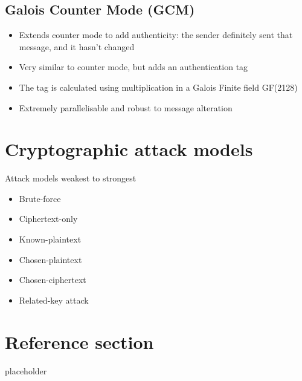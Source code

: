 \documentclass{article}
\begin{document}
\subsection{Galois Counter Mode (GCM)}
\begin{itemize}
  \item Extends counter mode to add authenticity: the sender definitely sent that message, and it hasn’t changed 
  \item Very similar to counter mode, but adds an authentication tag 
  \item The tag is calculated using multiplication in a Galois Finite field GF(2128) 
  \item Extremely parallelisable and robust to message alteration
\end{itemize}

\section{Cryptographic attack models}
\begin{flushleft}
Attack models weakest to strongest
\end{flushleft}
\begin{itemize}
  \item Brute-force 
  \item Ciphertext-only 
  \item Known-plaintext 
  \item Chosen-plaintext 
  \item Chosen-ciphertext 
  \item Related-key attack
\end{itemize}

\pagebreak
\section*{Reference section} \label{sec:reference}
\begin{description}
	\item[placeholder] \hfill \\
\end{description}
\end{document}

